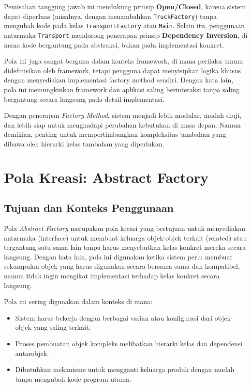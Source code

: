Pemisahan tanggung jawab ini mendukung prinsip \textbf{Open/Closed}, karena sistem dapat diperluas (misalnya, dengan menambahkan \texttt{TruckFactory}) tanpa mengubah kode pada kelas \texttt{TransportFactory} atau \texttt{Main}. Selain itu, penggunaan antarmuka \texttt{Transport} mendorong penerapan prinsip \textbf{Dependency Inversion}, di mana kode bergantung pada abstraksi, bukan pada implementasi konkret.

Pola ini juga sangat berguna dalam konteks framework, di mana perilaku umum didefinisikan oleh framework, tetapi pengguna dapat menyisipkan logika khusus dengan menyediakan implementasi factory method sendiri. Dengan kata lain, pola ini memungkinkan framework dan aplikasi saling berinteraksi tanpa saling bergantung secara langsung pada detail implementasi.

Dengan penerapan \textit{Factory Method}, sistem menjadi lebih modular, mudah diuji, dan lebih siap untuk menghadapi perubahan kebutuhan di masa depan. Namun demikian, penting untuk mempertimbangkan kompleksitas tambahan yang dibawa oleh hierarki kelas tambahan yang diperlukan.



\section{Pola Kreasi: Abstract Factory}

\subsection{Tujuan dan Konteks Penggunaan}

Pola \textit{Abstract Factory} merupakan pola kreasi yang bertujuan untuk menyediakan antarmuka (interface) untuk membuat keluarga objek-objek terkait (related) atau tergantung satu sama lain tanpa harus menyebutkan kelas konkret mereka secara langsung. Dengan kata lain, pola ini digunakan ketika sistem perlu membuat sekumpulan objek yang harus digunakan secara bersama-sama dan kompatibel, namun tidak ingin mengikat implementasi terhadap kelas konkret secara langsung.

Pola ini sering digunakan dalam konteks di mana:
\begin{itemize}
	\item Sistem harus bekerja dengan berbagai varian atau konfigurasi dari objek-objek yang saling terkait.
	\item Proses pembuatan objek kompleks melibatkan hierarki kelas dan dependensi antarobjek.
	\item Dibutuhkan mekanisme untuk mengganti keluarga produk dengan mudah tanpa mengubah kode program utama.
\end{itemize}

